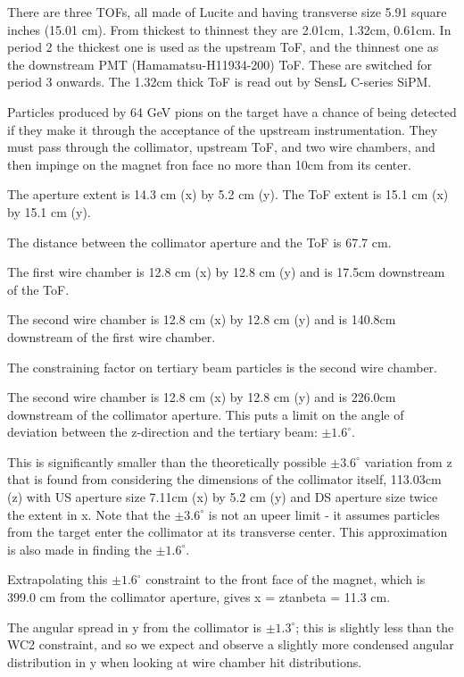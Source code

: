 There are three TOFs, all made of Lucite and having transverse size 5.91 square inches (15.01 cm). From thickest to thinnest they are 2.01cm, 1.32cm, 0.61cm. In period 2 the thickest one is used as the upstream ToF, and the thinnest one as the downstream PMT (Hamamatsu-H11934-200) ToF. These are switched for period 3 onwards. The 1.32cm thick ToF is read out by SensL C-series SiPM.

Particles produced by 64 GeV pions on the target have a chance of being detected if they make it through the acceptance of the upstream instrumentation. They must pass through the collimator, upstream ToF, and two wire chambers, and then impinge on the magnet fron face no more than 10cm from its center.

The aperture extent is 14.3 cm (x) by 5.2 cm (y). The ToF extent is 15.1 cm (x) by 15.1 cm (y).

The distance between the collimator aperture and the ToF is 67.7 cm.

The first wire chamber is 12.8 cm (x) by 12.8 cm (y) and is 17.5cm downstream of the ToF.

The second wire chamber is 12.8 cm (x) by 12.8 cm (y) and is 140.8cm downstream of the first wire chamber.

The constraining factor on tertiary beam particles is the second wire chamber.

The second wire chamber is 12.8 cm (x) by 12.8 cm (y) and is 226.0cm downstream of the collimator aperture. This puts a limit on the angle of deviation between the z-direction and the tertiary beam: $\pm 1.6^{\circ}$.

This is significantly smaller than the theoretically possible $\pm 3.6^{\circ}$ variation from z that is found from considering the dimensions of the collimator itself, 113.03cm (z) with US aperture size 7.11cm (x) by 5.2 cm (y) and DS aperture size twice the extent in x. Note that the $\pm 3.6^{\circ}$ is not an upeer limit - it assumes particles from the target enter the collimator at its transverse center. This approximation is also made in finding the $\pm 1.6^{\circ}$.

Extrapolating this $\pm 1.6^{\circ}$ constraint to the front face of the magnet, which is 399.0 cm from the collimator aperture, gives x = ztanbeta = 11.3 cm.

The angular spread in y from the collimator is $\pm 1.3^{\circ}$; this is slightly less than the WC2 constraint, and so we expect and observe a slightly more condensed angular distribution in y when looking at wire chamber hit distributions. 

